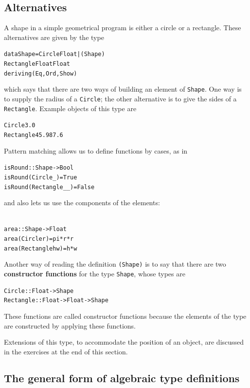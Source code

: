 \subsection*{Alternatives}

A shape in a simple geometrical program is either a circle or a
rectangle. These alternatives are given by the type
\begin{alltt}
data Shape = Circle Float |\hfill(Shape)
             Rectangle Float Float
             deriving (Eq,Ord,Show)
\end{alltt}
which says that there are two ways of building an element of \texttt{Shape}. One
way is to supply the radius of a \texttt{Circle}; the other alternative is to give
the sides of a \texttt{Rectangle}. Example objects of this type are

\begin{alltt}
Circle 3.0
Rectangle 45.9 87.6
\end{alltt}
Pattern matching allows us to define functions by cases, as
in
\begin{alltt}
isRound :: Shape -> Bool
isRound (Circle _)      = True
isRound (Rectangle _ _) = False
\end{alltt}
and also lets us use the 
components of the elements:
\begin{alltt}\label{areaDef}
area :: Shape -> Float
area (Circle r)      = pi*r*r
area (Rectangle h w) = h*w
\end{alltt}
Another way of reading the definition \texttt{(Shape)} is to say that
there are two \textbf{constructor functions} for the type \texttt{Shape}, whose
types are
\begin{alltt}
Circle    :: Float -> Shape
Rectangle :: Float -> Float -> Shape
\end{alltt}
These functions are called constructor functions because the elements of
the type are constructed by applying these functions.

Extensions of this type, to accommodate the position of an object, are
discussed in the exercises at the end of this section.

\subsection*{The general form of algebraic type definitions}

